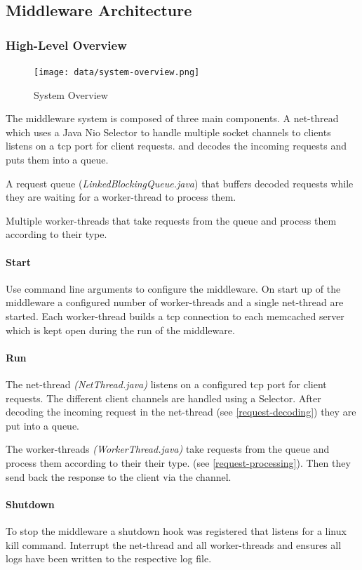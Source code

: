 \documentclass[11pt,a4paper]{article}
\begin{document}
\subsection{Middleware Architecture}
\subsubsection{High-Level Overview}

\begin{figure}
	\centering
	\texttt{[image: data/system-overview.png]}
	\caption{System Overview}
\end{figure}
The middleware system is composed of three main components. 
A net-thread which uses a Java Nio Selector to handle multiple socket channels to clients listens on a tcp port for client requests. and decodes the incoming requests and puts them into a queue.

A request queue (\emph{LinkedBlockingQueue.java}) that buffers decoded requests while they are waiting for a worker-thread to process them.

Multiple worker-threads that take requests from the queue and process them according to their type.

\paragraph{Start}
Use command line  arguments to configure the middleware.
On start up of the middleware a configured number of worker-threads and a single net-thread are started.
Each worker-thread builds a tcp connection to each memcached server which is kept open during the run of the middleware.

\paragraph{Run}
The net-thread \emph{(NetThread.java)} listens on a configured tcp port for client requests. The different client channels are handled using a Selector.
After decoding the incoming request in the net-thread (see \ref{request-decoding}) they are put into a queue.

The worker-threads \emph{(WorkerThread.java)} take requests from the queue and process them according to their their type. (see \ref{request-processing}). Then they send back the response to the client via the channel.


\paragraph{Shutdown}
To stop the middleware a shutdown hook was registered that listens for a linux kill command.
Interrupt the net-thread and all worker-threads and ensures all logs have been written to the respective log file.
\end{document}
